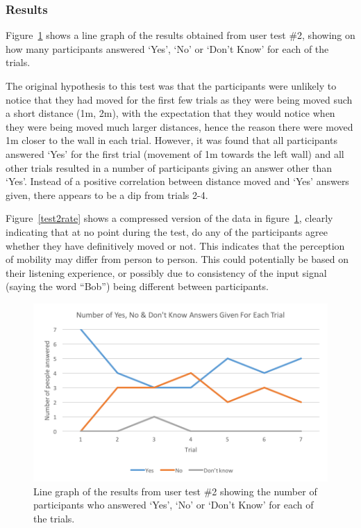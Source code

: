 \documentclass[../../main.tex]{subfiles}
\begin{document}
			\subsubsection{Results}

				Figure~\ref{test2results} shows a line graph of the results obtained from user test \#2, showing on how many participants answered `Yes', `No' or `Don't Know' for each of the trials.

				The original hypothesis to this test was that the participants were unlikely to notice that they had moved for the first few trials as they were being moved such a short distance (1m, 2m), with the expectation that they would notice when they were being moved much larger distances, hence the reason there were moved 1m closer to the wall in each trial. However, it was found that all participants answered `Yes' for the first trial (movement of 1m towards the left wall) and all other trials resulted in a number of participants giving an answer other than `Yes'. Instead of a positive correlation between distance moved and `Yes' answers given, there appears to be a dip from trials 2-4.

				Figure~\ref{test2rate} shows a compressed version of the data in figure~\ref{test2results}, clearly indicating that at no point during the test, do any of the participants agree whether they have definitively moved or not. This indicates that the perception of mobility may differ from person to person. This could potentially be based on their listening experience, or possibly due to consistency of the input signal (saying the word ``Bob'') being different between participants.

				\begin{figure}[H]
					\centerline{\includegraphics[scale = 1]{Sections/userTesting/images/test2/Q2_edit.png}}
					\caption{Line graph of the results from user test \#2 showing the number of participants who answered `Yes', `No' or `Don't Know' for each of the trials.}
					\label{test2results}
				\end{figure}
\end{document}
